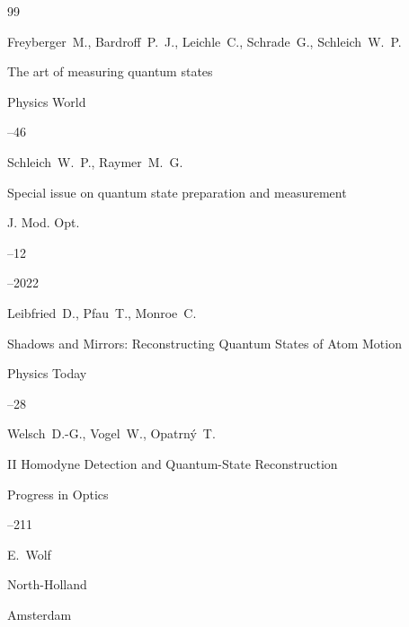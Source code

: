 \begin{thebibliography}{99}

\by  Freyberger~M., Bardroff~P.~J., Leichle~C., Schrade~G.,  Schleich~W.~P.

\paper The art of measuring quantum states

 \jour Physics World




--46







\by  Schleich~W.~P., Raymer~M.~G.

\paper Special issue on quantum state preparation and measu\-rement

\jour J. Mod. Opt.



--12 

--2022





\by  Leibfried~D., Pfau~T., Monroe~C.

\paper Shadows and Mirrors: Reconstructing Quantum States of Atom Motion

 \jour Physics Today




--28





\by Welsch~D.-G., Vogel~W.,  Opatrn\'y~T.

\paper II Homodyne Detection and Quantum-State Reconstruction


\inbook Progress in Optics 

--211


\ed E.~Wolf

\publ North-Holland

\publaddr Amsterdam


\end{thebibliography}
